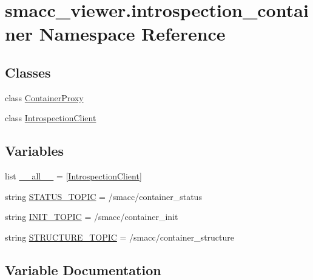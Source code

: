 \hypertarget{namespacesmacc__viewer_1_1introspection__container}{}\section{smacc\+\_\+viewer.\+introspection\+\_\+container Namespace Reference}
\label{namespacesmacc__viewer_1_1introspection__container}
\subsection*{Classes}
\begin{DoxyCompactItemize}
\item 
class \hyperlink{classsmacc__viewer_1_1introspection__container_1_1ContainerProxy}{Container\+Proxy}
\item 
class \hyperlink{classsmacc__viewer_1_1introspection__container_1_1IntrospectionClient}{Introspection\+Client}
\end{DoxyCompactItemize}
\subsection*{Variables}
\begin{DoxyCompactItemize}
\item 
list \hyperlink{namespacesmacc__viewer_1_1introspection__container_af073584e4a098be8fd1edaaed187d9e4}{\+\_\+\+\_\+all\+\_\+\+\_\+} = \mbox{[}\textquotesingle{}\hyperlink{classsmacc__viewer_1_1introspection__container_1_1IntrospectionClient}{Introspection\+Client}\textquotesingle{}\mbox{]}
\item 
string \hyperlink{namespacesmacc__viewer_1_1introspection__container_af478107f01151ac7abee0291a9cb2466}{S\+T\+A\+T\+U\+S\+\_\+\+T\+O\+P\+IC} = \textquotesingle{}/smacc/container\+\_\+status\textquotesingle{}
\item 
string \hyperlink{namespacesmacc__viewer_1_1introspection__container_a581804d065a1abc917b27a1ce8c38d1d}{I\+N\+I\+T\+\_\+\+T\+O\+P\+IC} = \textquotesingle{}/smacc/container\+\_\+init\textquotesingle{}
\item 
string \hyperlink{namespacesmacc__viewer_1_1introspection__container_a337acee85dd70b0fff1ed5b256b7a85a}{S\+T\+R\+U\+C\+T\+U\+R\+E\+\_\+\+T\+O\+P\+IC} = \textquotesingle{}/smacc/container\+\_\+structure\textquotesingle{}
\end{DoxyCompactItemize}


\subsection{Variable Documentation}
